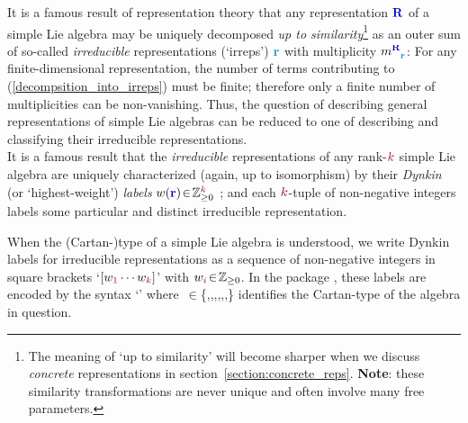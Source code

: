 \documentclass[12pt,a4paper]{article}\let\ifpdf\relax
\begin{document}
It is a famous result of representation theory that any representation $\mathbf{\b{R}}$ of a simple Lie algebra may be uniquely decomposed \emph{up to similarity}\footnote{The meaning of `up to similarity' will become sharper when we discuss \emph{concrete} representations in \mbox{section~\ref{section:concrete_reps}}. \textbf{Note}: these similarity transformations are never unique and often involve many free parameters.} as an outer sum of so-called \emph{irreducible} representations (`irreps') $\mathbf{\t{r}}$ with multiplicity $m\indices{\mathbf{\b{R}}}{\mathbf{\t{r}}}$:
%
%
For any finite-dimensional representation, the number of terms contributing to (\ref{decompsition_into_irreps}) must be finite; therefore only a finite number of multiplicities can be non-vanishing. Thus, the question of describing general representations of simple Lie algebras can be reduced to one of describing and classifying their irreducible representations.\\[-10pt]

It is a famous result that the \emph{irreducible} representations of any rank-$\r{k}$ simple Lie algebra are uniquely characterized (again, up to isomorphism) by their \emph{Dynkin} (or `highest-weight') \emph{labels} $w(\mathbf{\b{r}})\!\in\!\mathbb{Z}^{\r{k}}_{\geq0}$ \cite{Dynkin:1957um}; and each $\r{k}$-tuple of non-negative integers labels some particular and distinct irreducible representation. 

When the (Cartan-)type of a simple Lie algebra is understood, we write Dynkin labels for irreducible representations as a sequence of non-negative integers in square brackets `$[w_{\r{1}}\cdots w_{\r{k}}]$' with $w_{\r{i}}\!\in\!\mathbb{Z}_{\geq0}$. In the package \rpackage, these labels are encoded by the syntax `\mbox{\hyperlink{label:w}{}}' where $\,\in$\{,,,,,,\} identifies the Cartan-{type} of the algebra in question.\\[-10pt]
\end{document}
